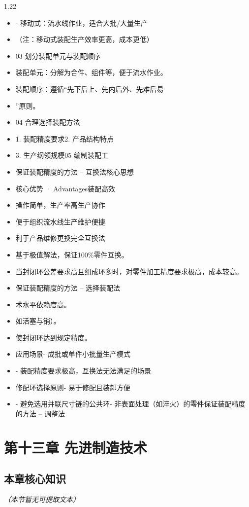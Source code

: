 \documentclass[12pt,a4paper]{article}
\begin{document}
\begin{spacing}{1.22}
\begin{itemize}[leftmargin=2.2em,label=--]
  \item - 移动式：流水线作业，适合大批/大量生产
  \item （注：移动式装配生产效率更高，成本更低）
  \item 03 划分装配单元与装配顺序
  \item 装配单元：分解为合件、组件等，便于流水作业。
  \item 装配顺序：遵循“先下后上、先内后外、先难后易
  \item ”原则。
  \item 04 合理选择装配方法
  \item 1. 装配精度要求2. 产品结构特点
  \item 3. 生产纲领规模05 编制装配工
  \item 保证装配精度的方法 – 互换法核心思想
  \item 核心优势 · Advantages装配高效
  \item 操作简单，生产率高生产协作
  \item 便于组织流水线生产维护便捷
  \item 利于产品维修更换完全互换法
  \item 基于极值解法，保证100\%零件互换。
  \item 当封闭环公差要求高且组成环多时，对零件加工精度要求极高，成本较高。
  \item 保证装配精度的方法 – 选择装配法
  \item 术水平依赖度高。
  \item 如活塞与销）。
  \item 使封闭环达到规定精度。
  \item 应用场景- 成批或单件小批量生产模式
  \item - 装配精度要求极高，互换法无法满足的场景
  \item 修配环选择原则- 易于修配且装卸方便
  \item - 避免选用并联尺寸链的公共环- 非表面处理（如淬火）的零件保证装配精度的方法 – 调整法
\end{itemize}

\section{第十三章 先进制造技术}
\subsection{本章核心知识}
\textit{（本节暂无可提取文本）}


\end{spacing}
\end{document}
